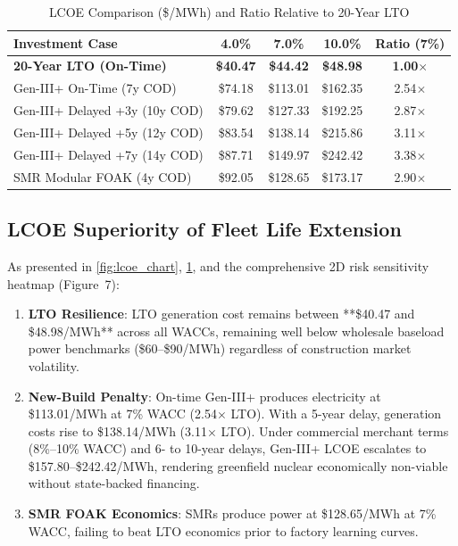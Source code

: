 \documentclass[10pt, twocolumn, a4paper]{article}
\begin{document}
\begin{table}[htbp]
\centering
\small
\caption{LCOE Comparison (\$/MWh) and Ratio Relative to 20-Year LTO}
\label{tab:lcoe_table}
\begin{tabular}{lcccc}
\toprule
\textbf{Investment Case} & \textbf{4.0\%} & \textbf{7.0\%} & \textbf{10.0\%} & \textbf{Ratio (7\%)} \\
\midrule
\textbf{20-Year LTO (On-Time)} & \textbf{\$40.47} & \textbf{\$44.42} & \textbf{\$48.98} & \textbf{1.00$\times$} \\
Gen-III+ On-Time (7y COD)      & \$74.18          & \$113.01         & \$162.35         & 2.54$\times$ \\
Gen-III+ Delayed +3y (10y COD) & \$79.62          & \$127.33         & \$192.25         & 2.87$\times$ \\
Gen-III+ Delayed +5y (12y COD) & \$83.54          & \$138.14         & \$215.86         & 3.11$\times$ \\
Gen-III+ Delayed +7y (14y COD) & \$87.71          & \$149.97         & \$242.42         & 3.38$\times$ \\
SMR Modular FOAK (4y COD)      & \$92.05          & \$128.65         & \$173.17         & 2.90$\times$ \\
\bottomrule
\end{tabular}
\end{table}

\subsection{LCOE Superiority of Fleet Life Extension}
As presented in \cref{fig:lcoe_chart}, \cref{tab:lcoe_table}, and the comprehensive 2D risk sensitivity heatmap (Figure~7):
\begin{enumerate}
    \item \textbf{LTO Resilience}: LTO generation cost remains between **\$40.47 and \$48.98/MWh** across all WACCs, remaining well below wholesale baseload power benchmarks (\$60--\$90/MWh) regardless of construction market volatility.
    \item \textbf{New-Build Penalty}: On-time Gen-III+ produces electricity at \$113.01/MWh at 7\% WACC (2.54$\times$ LTO). With a 5-year delay, generation costs rise to \$138.14/MWh (3.11$\times$ LTO). Under commercial merchant terms (8\%--10\% WACC) and 6- to 10-year delays, Gen-III+ LCOE escalates to \$157.80--\$242.42/MWh, rendering greenfield nuclear economically non-viable without state-backed financing.
    \item \textbf{SMR FOAK Economics}: SMRs produce power at \$128.65/MWh at 7\% WACC, failing to beat LTO economics prior to factory learning curves.
\end{enumerate}
\end{document}
